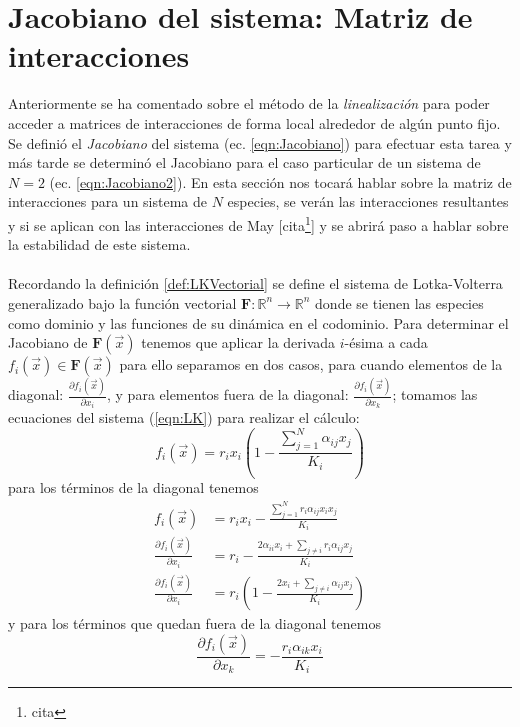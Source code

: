 \section{Jacobiano del sistema: Matriz de interacciones}

Anteriormente se ha comentado sobre el método de la \textit{linealización} para poder acceder a matrices de interacciones de forma local alrededor de algún punto fijo. Se definió el \textit{Jacobiano} del sistema (ec. \ref{eqn:Jacobiano}) para efectuar esta tarea y más tarde se determinó el Jacobiano para el caso particular de un sistema de $N=2$ (ec. \ref{eqn:Jacobiano2}). En esta sección nos tocará hablar sobre la matriz de interacciones para un sistema de $N$ especies, se verán las interacciones resultantes y si se aplican con las interacciones de May [cita\footnote{cita}] y se abrirá paso a hablar sobre la estabilidad de este sistema.\\
\\
Recordando la definición \ref{def:LKVectorial} se define el sistema de Lotka-Volterra generalizado bajo la función vectorial $\mathbf{F}:\mathbb{R}^n\to\mathbb{R}^n$ donde se tienen las especies como dominio y las funciones de su dinámica en el codominio. Para determinar el Jacobiano de $\mathbf{F}(\vec{x})$ tenemos que aplicar la derivada $i$-ésima a cada $f_i(\vec{x})\in\mathbf{F}(\vec{x})$ para ello separamos en dos casos, para cuando elementos de la diagonal: $\frac{\partial f_i(\vec{x})}{\partial x_i}$, y para elementos fuera de la diagonal: $\frac{\partial f_i(\vec{x})}{\partial x_k}$; tomamos las ecuaciones del sistema (\ref{eqn:LK}) para realizar el cálculo:
$$
f_i(\vec{x}) = r_ix_i\left (1-\frac{\sum_{j=1}^N \alpha_{ij}x_j}{K_i}\right )
$$
para los términos de la diagonal tenemos
\begin{equation}\label{eqn:Jacobiano_ii}
	\begin{split}
			f_i(\vec{x}) &= r_ix_i - \frac{\sum_{j=1}^N r_i\alpha_{ij}x_ix_j}{K_i} \\
			\frac{\partial f_i(\vec{x})}{\partial x_i} &= r_i -
			\frac{2\alpha_{ii}x_i+\sum_{j\neq i} r_i\alpha_{ij}x_j}{K_i}\\
			\frac{\partial f_i(\vec{x})}{\partial x_i} &= r_i \left (1-\frac{2x_i+\sum_{j\neq i}\alpha_{ij}x_j}{K_i}\right )
	\end{split}
\end{equation}
y para los términos que quedan fuera de la diagonal tenemos
\begin{equation}\label{eqn:Jacobiano_ij}
		\frac{\partial f_i(\vec{x})}{\partial x_k} = -\frac{r_i\alpha_{ik}x_i}{K_i} 
\end{equation}
